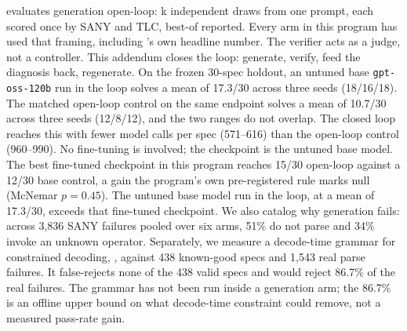 \ours{} evaluates \tlaplus{} generation open-loop: k independent draws from one
prompt, each scored once by SANY and TLC, best-of reported. Every arm in this
program has used that framing, including \ours{}'s own headline number. The
verifier acts as a judge, not a controller. This addendum closes the loop:
generate, verify, feed the diagnosis back, regenerate. On the frozen 30-spec
holdout, an untuned base \texttt{gpt-oss-120b} run in the loop solves a mean of
17.3/30 across three seeds (18/16/18). The matched open-loop control on the
same endpoint solves a mean of 10.7/30 across three seeds (12/8/12), and the
two ranges do not overlap. The closed loop reaches this with fewer model calls
per spec (571--616) than the open-loop control (960--990). No fine-tuning is
involved; the checkpoint is the untuned base model. The best fine-tuned
checkpoint in this program reaches 15/30 open-loop against a 12/30 base
control, a gain the program's own pre-registered rule marks null (McNemar
$p=0.45$). The untuned base model run in the loop, at a mean of 17.3/30,
exceeds that fine-tuned checkpoint. We also catalog why generation fails:
across 3,836 SANY failures pooled over six arms, 51\% do not parse and 34\%
invoke an unknown operator. Separately, we measure a decode-time grammar for
constrained decoding, \gfile{}, against 438 known-good
specs and 1,543 real parse failures. It false-rejects none of the 438 valid
specs and would reject 86.7\% of the real failures. The grammar has not been
run inside a generation arm; the 86.7\% is an offline upper bound on what
decode-time constraint could remove, not a measured pass-rate gain.

